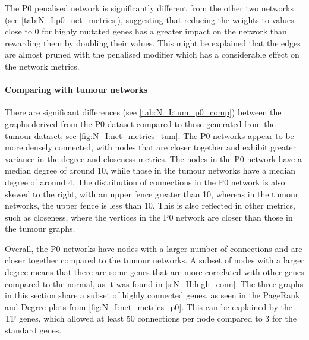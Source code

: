 The P0 penalised network is significantly different from the other two networks (see \cref{tab:N_I:p0_net_metrics}), suggesting that reducing the weights to values close to 0 for highly mutated genes has a greater impact on the network than rewarding them by doubling their values. This might be explained that the edges are almost pruned with the penalised modifier which has a considerable effect on the network metrics.



\paragraph*{Comparing with tumour networks}

There are significant differences (see \cref{tab:N_I:tum_p0_comp}) between the graphs derived from the P0 dataset compared to those generated from the tumour dataset; see \cref{fig:N_I:net_metrics_tum}. The P0 networks appear to be more densely connected, with nodes that are closer together and exhibit greater variance in the degree and closeness metrics. The nodes in the P0 network have a median degree of around 10, while those in the tumour networks have a median degree of around 4. The distribution of connections in the P0 network is also skewed to the right, with an upper fence greater than 10, whereas in the tumour networks, the upper fence is less than 10. This is also reflected in other metrics, such as closeness, where the vertices in the P0 network are closer than those in the tumour graphs.


Overall, the P0 networks have nodes with a larger number of connections and are closer together compared to the tumour networks. A subset of nodes with a larger degree means that there are some genes that are more correlated with other genes compared to the normal, as it was found in \cref{s:N_II:high_conn}. The three graphs in this section share a subset of highly connected genes, as seen in the PageRank and Degree plots from \cref{fig:N_I:net_metrics_p0}. This can be explained by the TF genes, which allowed at least 50 connections per node compared to 3 for the standard genes. 

